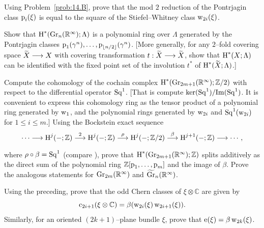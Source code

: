 \documentclass[../main]{subfiles}
\begin{document}
\begin{problem}
\label{prob:15-A}
Using Problem~\ref{prob:14.B}, prove that the mod $2$ reduction of the Pontrjagin class $\operatorname{p}_i(\xi)$ is equal to the square of the Stiefel--Whitney class $\operatorname{w}_{2i}(\xi)$.
\end{problem}

\begin{problem}
\label{prob:15-B}
Show that $\operatorname{H}^\ast(\operatorname{Gr}_n({\mathbb R}^\infty); \Lambda)$ is a polynomial ring over $\Lambda$ generated by the Pontrjagin classes $\operatorname{p}_1(\gamma^n), \ldots, \operatorname{p}_{\lfloor n/2\rfloor}(\gamma^n)$. [More generally, for any $2$--fold covering space ${\xtilde X} \longrightarrow X$ with covering transformation $t : {\xtilde X} \longrightarrow {\xtilde X}$, show that $\operatorname{H}^\ast(X; \Lambda)$ can be identified with the fixed point set of the involution $t^\ast$ of $\homology^\ast({\xtilde X}; \Lambda)$.]
\end{problem}

\begin{problem}
\label{prob:15-C}
Compute the cohomology of the cochain complex \newline $\operatorname{H}^\ast(\operatorname{Gr}_{2m + 1}({\mathbb R}^\infty); {\mathbb Z}/2)$ with respect to the differential operator $\operatorname{Sq}^1$. [That is compute $\ker(\operatorname{Sq}^1)/\mathrm{Im}(\operatorname{Sq}^1)$. It is convenient to express this cohomology ring as the tensor product of a polynomial ring generated by $\operatorname{w}_1$, and the polynomial rings generated by $\operatorname{w}_{2i}$ and $\operatorname{Sq}^1(\operatorname{w}_{2i})$ for $1 \le i \le m$.] Using the Bockstein exact sequence \[\cdots \varrightarrow{} \homology^j(-; \mathbb Z) \varrightarrow{2} \homology^j(-; \mathbb Z) \varrightarrow{\rho} \homology^j(-; {\mathbb Z}/2) \varrightarrow{\beta} \homology^{j + 1}(-; \mathbb Z) \varrightarrow{} \cdots,\] where $\rho \circ \beta = \operatorname{Sq}^1$ (compare \cite[p. 2]{steenrod1962cohomology}), prove that $\operatorname{H}^\ast(\operatorname{Gr}_{2m + 1}({\mathbb R}^\infty); \mathbb Z)$ splits additively as the direct sum of the polynomial ring $\mathbb Z[\operatorname{p}_1, \ldots, \operatorname{p}_m]$ and the image of $\beta$. Prove the analogous statements for $\operatorname{Gr}_{2m}({\mathbb R}^\infty)$ and ${\xtilde \grassmannian}_n({\mathbb R}^\infty)$. 
\end{problem}

\begin{problem}
\label{prob:15-D}
Using the preceding, prove that the odd Chern classes of $\xi \otimes \mathbb C$ are given by \[\operatorname{c}_{2i+1}(\xi \otimes \mathbb C) = \beta(\operatorname{w}_{2i}(\xi)\operatorname{w}_{2i + 1}(\xi)).\] Similarly, for an oriented $(2k + 1)$--plane bundle $\xi$, prove that $\operatorname{e}(\xi) = \beta \operatorname{w}_{2k}(\xi)$. 
\end{problem}
\end{document}
